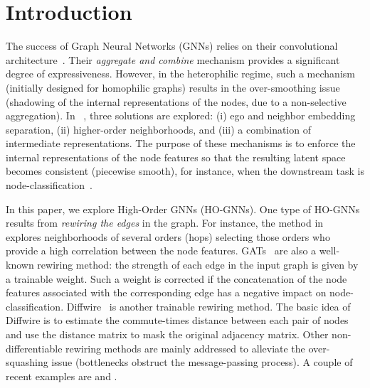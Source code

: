 \documentclass{article}
\theoremstyle{plain}
\theoremstyle{definition}
\begin{document}
\section{Introduction}\label{sec:1}
The success of Graph Neural Networks (GNNs) relies on their convolutional architecture~\citep{kipf2017semi}\citep{hamilton2017inductive}\citep{velickovic2018gat}. Their  \emph{aggregate and combine} mechanism provides a significant degree of expressiveness. However, in the heterophilic regime, such a mechanism (initially designed for homophilic graphs) results in the over-smoothing issue (shadowing of the internal representations of the nodes, due to a non-selective aggregation). In ~\citep{Beyond2020}, three solutions are explored: (i) ego and neighbor embedding separation, (ii) higher-order neighborhoods, and (iii) a combination of intermediate representations. The purpose of these mechanisms is to enforce the internal representations of the node  features so that the resulting latent space becomes consistent (piecewise smooth), for instance, when the downstream task is node-classification~\citep{Non-Local22}\citep{zhu2021graph}\citep{pmlr-v119-chen20v}. 

In this paper, we explore High-Order GNNs (HO-GNNs). One type of HO-GNNs results from \emph{rewiring the edges} in the graph. For instance, the method in~\citep{bi2022make} explores neighborhoods of several orders (hops) selecting those orders who provide a high correlation between the node features. GATs~\citep{velickovic2018gat} are also a well-known rewiring method: the strength of each edge in the input graph is given by a trainable weight. Such a weight is corrected if the concatenation of the node features associated with the corresponding edge has a negative impact on node-classification. Diffwire~\citep{arnaiz2022diffwire} is another trainable rewiring method. The basic idea of Diffwire is to estimate the commute-times distance between each pair of nodes and use the distance matrix to mask the original adjacency matrix. Other non-differentiable rewiring methods are mainly addressed to alleviate the over-squashing issue (bottlenecks obstruct the message-passing process). A couple of recent examples are \citep{topping2022understanding} and \citep{digiovanni2023oversquashing}. 
\end{document}
